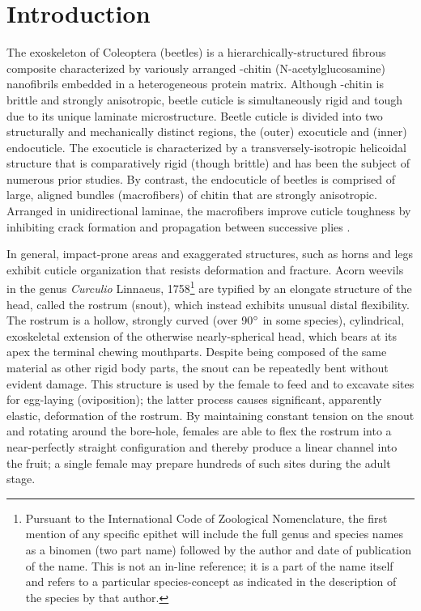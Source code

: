 \documentclass[twocolumn, linenumbers, superscriptaddress, nofootinbib]{revtex4-1}
\begin{document}
\section*{Introduction}
	{The exoskeleton of Coleoptera (beetles) is a hierarchically-structured fibrous composite characterized by variously arranged \textalpha-chitin (N-acetylglucosamine) nanofibrils embedded in a heterogeneous protein matrix.
	Although \textalpha-chitin is brittle and strongly anisotropic, beetle cuticle is simultaneously rigid and tough due to its unique laminate microstructure.
	Beetle cuticle is divided into two structurally and mechanically distinct regions, the (outer) exocuticle and (inner) endocuticle.
	The exocuticle is characterized by a transversely-isotropic helicoidal structure that is comparatively rigid (though brittle) and has been the subject of numerous prior studies.
	By contrast, the endocuticle of beetles is comprised of large, aligned bundles (macrofibers) of chitin that are strongly anisotropic.
	Arranged in unidirectional laminae, the macrofibers improve cuticle toughness by inhibiting crack formation and propagation between successive plies \cite{Kamp2010,Kamp2015,Hepburn1973}.
	
	In general, impact-prone areas and exaggerated structures, such as horns and legs exhibit cuticle organization that resists deformation and fracture.
	Acorn weevils in the genus \textit{Curculio} Linnaeus, 1758\footnote{Pursuant to the International Code of Zoological Nomenclature, the first mention of any specific epithet will include the full genus and species names as a binomen (two part name) followed by the author and date of publication of the name.
	This is not an in-line reference; it is a part of the name itself and refers to a particular species-concept as indicated in the description of the species by that author.} are typified by an elongate structure of the head, called the rostrum (snout), which instead exhibits unusual distal flexibility.
	The rostrum is a hollow, strongly curved (over 90$\degree$ in some species), cylindrical, exoskeletal extension of the otherwise nearly-spherical head, which bears at its apex the terminal chewing mouthparts.
	Despite being composed of the same material as other rigid body parts, the snout can be repeatedly bent without evident damage.
	This structure is used by the female to feed and to excavate sites for egg-laying (oviposition); the latter process causes significant, apparently elastic, deformation of the rostrum. 
	By maintaining constant tension on the snout and rotating around the bore-hole, females are able to flex the rostrum into a near-perfectly straight configuration and thereby produce a linear channel into the fruit; a single female may prepare hundreds of such sites during the adult stage.
	
}
\end{document}
